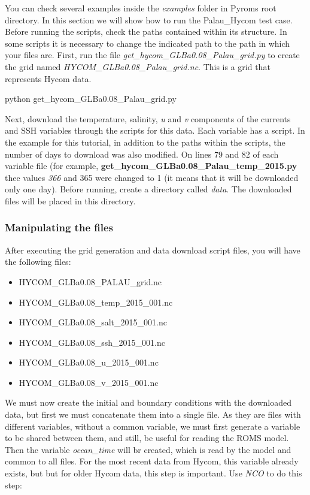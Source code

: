 \noindent You can check several examples inside the \textit{examples} folder in Pyroms root directory. In this section 
we will show how to run the Palau\_Hycom test case. Before running the scripts, check the paths contained within its structure. 
In some scripts it is necessary to change the indicated path to the path in which your files are. First, run the file \textit{get\_hycom\_GLBa0.08\_Palau\_grid.py}
to create the grid named \textit{HYCOM\_GLBa0.08\_Palau\_grid.nc}. This is a grid that represents Hycom data.
\bigskip

\begin{bashcode}
python get_hycom_GLBa0.08_Palau_grid.py
\end{bashcode}
\bigskip

\noindent Next, download the temperature, salinity, \textit{u} and \textit{v} components of the currents and SSH variables 
through the scripts for this data. Each variable has a script. In the example for this tutorial, in addition to the paths within the scripts, the number of days 
to download was also modified. On lines 79 and 82 of each variable file (for example, \textbf{get\_hycom\_GLBa0.08\_Palau\_temp\_2015.py} thee values \textit{366} and
365 were changed to 1 (it means that it will be downloaded only one day). Before running, create a directory called \textit{data}. The downloaded files will be placed in
this directory.
\bigskip

\subsubsection{Manipulating the files}
\bigskip

\noindent After executing the grid generation and data download script files, you will have the following files:
\bigskip

\begin{itemize}
    \item HYCOM\_GLBa0.08\_PALAU\_grid.nc
    \item HYCOM\_GLBa0.08\_temp\_2015\_001.nc
    \item HYCOM\_GLBa0.08\_salt\_2015\_001.nc
    \item HYCOM\_GLBa0.08\_ssh\_2015\_001.nc   
    \item HYCOM\_GLBa0.08\_u\_2015\_001.nc
    \item HYCOM\_GLBa0.08\_v\_2015\_001.nc    
\end{itemize}

\noindent We must now create the initial and boundary conditions with the downloaded data, but first we must concatenate them into a single file. 
As they are files with different variables, without a common variable, we must first generate a variable to be shared between them, and still, be useful 
for reading the ROMS model. Then the variable \textit{ocean\_time} will br created, which is read by the model and common to all files.
For the most recent data from Hycom, this variable already exists, but but for older Hycom data, this step is important. Use \textit{NCO} to do this step:
\bigskip

